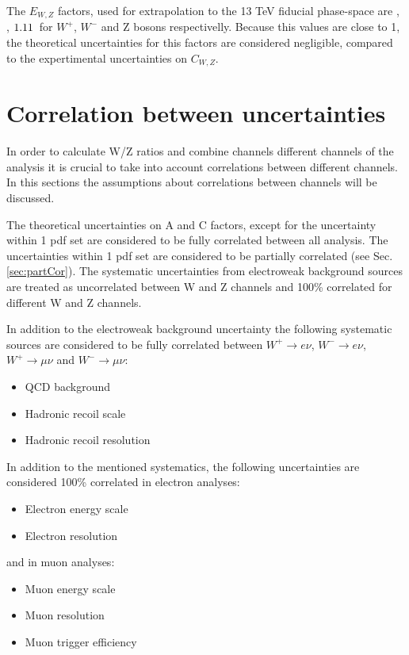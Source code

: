  The $E_{W,Z}$ factors, used for extrapolation to the 13 TeV fiducial phase-space are \WplusenuE, \WminenuE, $1.11\, $  for $W^{+}$, $W^-$ and Z bosons respectivelly. Because this values are close to 1, the theoretical uncertainties for this factors are considered negligible, compared to the expertimental uncertainties on $C_{W,Z}$.


 
\section{Correlation between uncertainties}\label{sec:Cor}

In order to calculate W/Z ratios and combine channels different channels of the analysis it is crucial to take into account correlations between different channels. In this sections the assumptions about correlations between channels will be discussed.

The theoretical uncertainties on A and C factors, except for the uncertainty within 1 pdf set are considered to be fully correlated between all analysis. The uncertainties within 1 pdf set are considered to be partially correlated (see Sec. \ref{sec:partCor}). The systematic uncertainties from electroweak background sources are treated as uncorrelated between W and Z channels and 100\% correlated for different W and Z channels.  

In addition to the electroweak background uncertainty the following systematic sources are considered to be fully correlated between $W^{+}\to e\nu$, $W^{-}\to e\nu$, $W^{+}\to \mu \nu$ and $W^{-}\to \mu \nu$:
\begin{itemize}
\item QCD background 
\item Hadronic recoil scale
\item Hadronic recoil resolution
\end{itemize}

In addition to the mentioned systematics, the following uncertainties are considered 100\% correlated in electron analyses:
\begin{itemize}
\item Electron energy scale
\item Electron resolution
\end{itemize}
and in muon analyses:
\begin{itemize}
\item Muon energy scale
\item Muon resolution
\item Muon trigger efficiency
\end{itemize}

